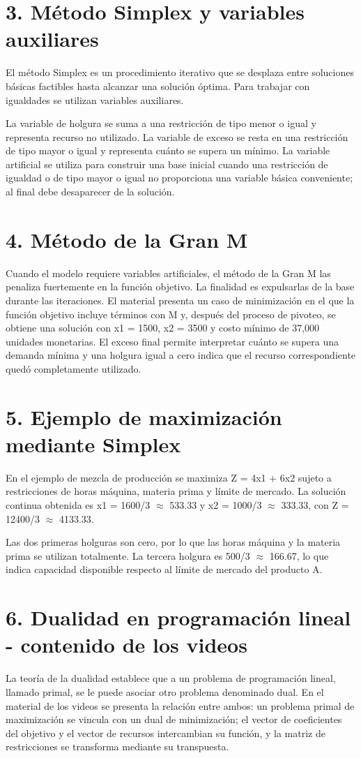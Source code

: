 \documentclass[11pt]{article}
\begin{document}
\section*{3. Método Simplex y variables auxiliares}
El método Simplex es un procedimiento iterativo que se desplaza entre soluciones básicas factibles hasta alcanzar una solución óptima. Para trabajar con igualdades se utilizan variables auxiliares.

La variable de holgura se suma a una restricción de tipo menor o igual y representa recurso no utilizado. La variable de exceso se resta en una restricción de tipo mayor o igual y representa cuánto se supera un mínimo. La variable artificial se utiliza para construir una base inicial cuando una restricción de igualdad o de tipo mayor o igual no proporciona una variable básica conveniente; al final debe desaparecer de la solución.


\section*{4. Método de la Gran M}
Cuando el modelo requiere variables artificiales, el método de la Gran M las penaliza fuertemente en la función objetivo. La finalidad es expulsarlas de la base durante las iteraciones. El material presenta un caso de minimización en el que la función objetivo incluye términos con M y, después del proceso de pivoteo, se obtiene una solución con x1 = 1500, x2 = 3500 y costo mínimo de 37,000 unidades monetarias. El exceso final permite interpretar cuánto se supera una demanda mínima y una holgura igual a cero indica que el recurso correspondiente quedó completamente utilizado.


\section*{5. Ejemplo de maximización mediante Simplex}
En el ejemplo de mezcla de producción se maximiza Z = 4x1 + 6x2 sujeto a restricciones de horas máquina, materia prima y límite de mercado. La solución continua obtenida es x1 = 1600/3 \(\approx\) 533.33 y x2 = 1000/3 \(\approx\) 333.33, con Z = 12400/3 \(\approx\) 4133.33.

Las dos primeras holguras son cero, por lo que las horas máquina y la materia prima se utilizan totalmente. La tercera holgura es 500/3 \(\approx\) 166.67, lo que indica capacidad disponible respecto al límite de mercado del producto A.


\section*{6. Dualidad en programación lineal - contenido de los videos}
La teoría de la dualidad establece que a un problema de programación lineal, llamado primal, se le puede asociar otro problema denominado dual. En el material de los videos se presenta la relación entre ambos: un problema primal de maximización se vincula con un dual de minimización; el vector de coeficientes del objetivo y el vector de recursos intercambian su función, y la matriz de restricciones se transforma mediante su transpuesta.
\end{document}
